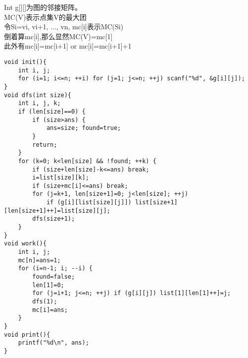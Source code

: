 Int g[][]为图的邻接矩阵。\\
MC(V)表示点集V的最大团\\
令Si={vi, vi+1, ..., vn}, mc[i]表示MC(Si)\\
倒着算mc[i],那么显然MC(V)=mc[1]\\
此外有mc[i]=mc[i+1] or mc[i]=mc[i+1]+1\\
\begin{lstlisting}
void init(){
	int i, j;
	for (i=1; i<=n; ++i) for (j=1; j<=n; ++j) scanf("%d", &g[i][j]);
}
void dfs(int size){
	int i, j, k;
	if (len[size]==0) {
		if (size>ans) {
			ans=size; found=true;
		}
		return;
	}
	for (k=0; k<len[size] && !found; ++k) {
		if (size+len[size]-k<=ans) break;
		i=list[size][k];
		if (size+mc[i]<=ans) break;
		for (j=k+1, len[size+1]=0; j<len[size]; ++j)
			if (g[i][list[size][j]]) list[size+1][len[size+1]++]=list[size][j];
		dfs(size+1);
	}
}
void work(){
	int i, j;
	mc[n]=ans=1;
	for (i=n-1; i; --i) {
		found=false;
		len[1]=0;
		for (j=i+1; j<=n; ++j) if (g[i][j]) list[1][len[1]++]=j;
		dfs(1);
		mc[i]=ans;
	}
}
void print(){
	printf("%d\n", ans);
}
\end{lstlisting}
